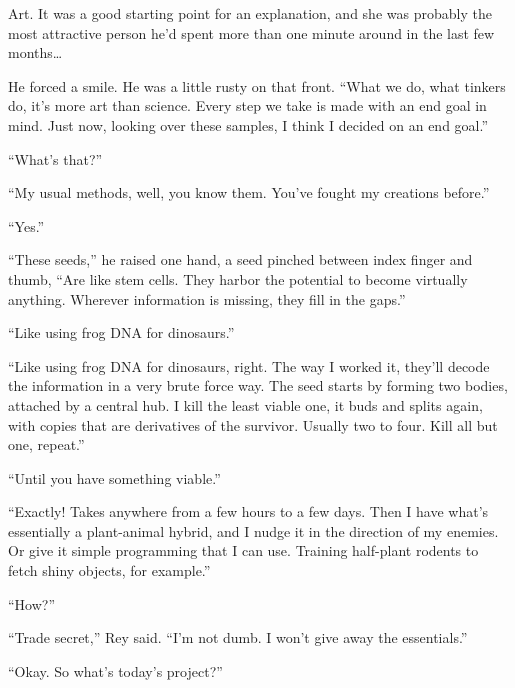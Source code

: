 Art.  It was a good starting point for an explanation, and she was probably the most attractive person he'd spent more than one minute around in the last few months\ldots



He forced a smile.  He was a little rusty on that front.  ``What we do, what tinkers do, it's more art than science.  Every step we take is made with an end goal in mind.  Just now, looking over these samples, I think I decided on an end goal.''



``What's that?''



``My usual methods, well, you know them.  You've fought my creations before.''



``Yes.''



``These seeds,'' he raised one hand, a seed pinched between index finger and thumb, ``Are like stem cells.  They harbor the potential to become virtually anything.  Wherever information is missing, they fill in the gaps.''



``Like using frog DNA for dinosaurs.''



``Like using frog DNA for dinosaurs, right.  The way I worked it, they'll decode the information in a very brute force way.  The seed starts by forming two bodies, attached by a central hub.  I kill the least viable one, it buds and splits again, with copies that are derivatives of the survivor.  Usually two to four.  Kill all but one, repeat.''



``Until you have something viable.''



``Exactly!  Takes anywhere from a few hours to a few days.  Then I have what's essentially a plant-animal hybrid, and I nudge it in the direction of my enemies.  Or give it simple programming that I can use.  Training half-plant rodents to fetch shiny objects, for example.''



``How?''



``Trade secret,'' Rey said.  ``I'm not dumb.  I won't give away the essentials.''



``Okay.  So what's today's project?''



